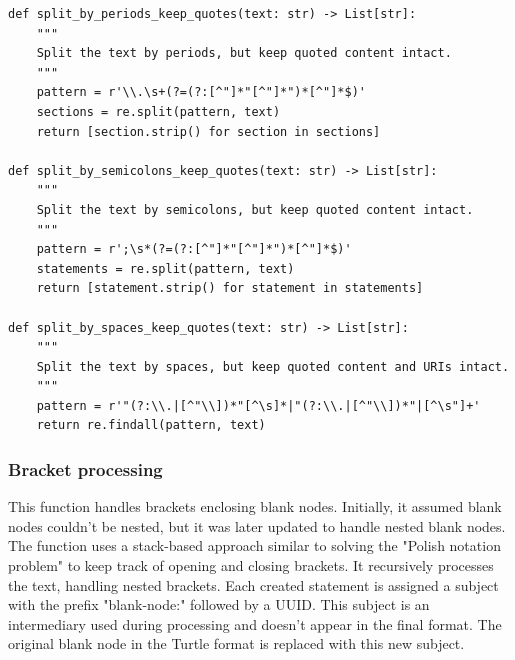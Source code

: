 {\footnotesize
\begin{verbatim}
def split_by_periods_keep_quotes(text: str) -> List[str]:
    """
    Split the text by periods, but keep quoted content intact.
    """
    pattern = r'\\.\s+(?=(?:[^"]*"[^"]*")*[^"]*$)'
    sections = re.split(pattern, text)
    return [section.strip() for section in sections]

def split_by_semicolons_keep_quotes(text: str) -> List[str]:
    """
    Split the text by semicolons, but keep quoted content intact.
    """
    pattern = r';\s*(?=(?:[^"]*"[^"]*")*[^"]*$)'
    statements = re.split(pattern, text)
    return [statement.strip() for statement in statements]

def split_by_spaces_keep_quotes(text: str) -> List[str]:
    """
    Split the text by spaces, but keep quoted content and URIs intact.
    """
    pattern = r'"(?:\\.|[^"\\])*"[^\s]*|"(?:\\.|[^"\\])*"|[^\s"]+'
    return re.findall(pattern, text)
\end{verbatim}
}

\subsubsection{Bracket processing}
This function handles brackets enclosing blank nodes. Initially, it assumed blank nodes couldn't be nested, but it was later updated to handle nested blank nodes. The function uses a stack-based approach similar to solving the "Polish notation problem" to keep track of opening and closing brackets. It recursively processes the text, handling nested brackets. Each created statement is assigned a subject with the prefix "blank-node:" followed by a UUID. This subject is an intermediary used during processing and doesn't appear in the final format. The original blank node in the Turtle format is replaced with this new subject.


